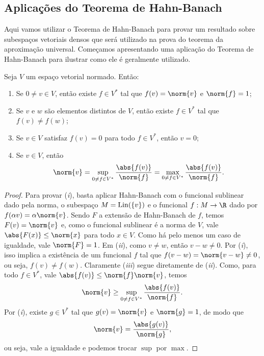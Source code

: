 \subsection{Aplicações do Teorema de Hahn-Banach}

Aqui vamos utilizar o Teorema de Hahn-Banach para provar um resultado sobre subespaços vetoriais densos que será utilizado na prova do teorema da aproximação universal.
Começamos apresentando uma aplicação do Teorema de Hahn-Banach para ilustrar como ele é geralmente utilizado.

\begin{teo}
    Seja \( V \) um espaço vetorial normado.
    Então:
    \begin{enumerate}[label=\roman*)]
        \item Se \( 0 \neq v \in V \), então existe \( f \in V^{ * } \) tal que \( f(v) = \norm{ v } \) e \( \norm{ f } = 1 \);
        \item Se \( v \) e \( w \) são elementos distintos de \( V \), então existe \( f \in V^{ * } \) tal que \( f(v) \neq f(w) \);
        \item Se \( v \in V \) satisfaz \( f(v) = 0 \) para todo \( f \in V^{ * } \), então \( v = 0 \);
        \item Se \( v \in V \), então \[
            \norm{ v }
            = \sup_{ 0 \neq f \in V^{ * } } \frac{ \abs{ f(v) } }{ \norm{ f } }
            = \max_{ 0 \neq f \in V^{ * } } \frac{ \abs{ f(v) } }{ \norm{ f } }
        .\]
    \end{enumerate}
\end{teo}
\begin{proof}
    Para provar (\emph{i}), basta aplicar Hahn-Banach com o funcional sublinear dado pela norma, o subespaço \( M = \operatorname{Lin} (\left\{ v \right\}) \) e o funcional \( f : M \to \R \) dado por \( f(\alpha v) = \alpha \norm{ v } \).
    Sendo \( F \) a extensão de Hahn-Banach de \( f \), temos \( F(v) = \norm{ v } \) e, como o funcional sublinear é a norma de \( V \), vale \( \abs{ F(x) } \leq \norm{ x } \) para todo \( x \in V \).
    Como há pelo menos um caso de igualdade, vale \( \norm{ F } = 1 \).
    Em (\emph{ii}), como \( v \neq w \), então \( v - w \neq 0 \).
    Por (\emph{i}), isso implica a existência de um funcional \( f \) tal que \( f(v - w) = \norm{ v - w } \neq 0 \), ou seja, \( f(v) \neq f(w) \).
    Claramente (\emph{iii}) segue diretamente de (\emph{ii}).
    Como, para todo \( f \in V^{ * } \), vale \( \abs{ f(v) } \leq \norm{ f } \norm{ v } \), temos \[
        \norm{ v } \geq \sup_{ 0 \neq f \in V^{ * } } \frac{ \abs{ f(v) } }{ \norm{ f } }
    .\]
    Por (\emph{i}), existe \( g \in V^{ * } \) tal que \( g(v) = \norm{ v } \) e \( \norm{ g } = 1 \), de modo que \[
        \norm{ v } = \frac{ \abs{ g(v) } }{ \norm{ g } }
    ,\]
    ou seja, vale a igualdade e podemos trocar \( \sup \) por \( \max \).
\end{proof}

